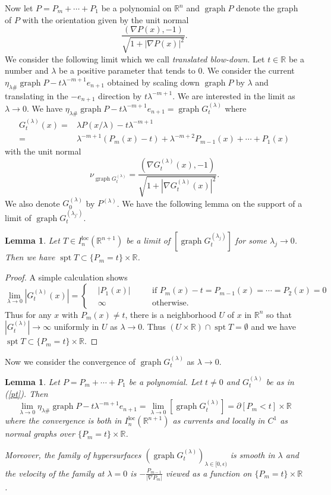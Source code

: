 \documentclass[pdflatex,sn-mathphys-num]{sn-jnl}%
\theoremstyle{thmstyleone}%
\newtheorem{lemma}[theorem]{Lemma}
\theoremstyle{thmstyletwo}%
\theoremstyle{thmstylethree}%
\newcommand{\R}{\mathbb{R}}
\newcommand{\loc}{\mathrm{loc}}
\DeclareMathOperator{\spt}{spt}
\DeclareMathOperator{\graph}{graph}
\begin{document}
Now let $P=P_m+\cdots+P_1$ be a polynomial on $\R^n$ and $\graph P$ denote the graph of $P$ with the orientation given by the unit normal \[\frac{(\nabla P(x),-1)}{\sqrt{1+|\nabla P(x)|^2}}.\] We consider the following limit which we call \textit{translated blow-down}. Let $t\in\R$ be a number and $\lambda$ be a positive parameter that tends to 0. We consider the current $\eta_{\lambda\#}\graph P-t\lambda^{-m+1}e_{n+1}$ obtained by scaling down $\graph P$ by $\lambda$ and translating in the $-e_{n+1}$ direction by $t\lambda^{-m+1}$. We are interested in the limit as $\lambda\to0$. We have $\eta_{\lambda\#}\graph P-t\lambda^{-m+1}e_{n+1}=\graph G_t^{(\lambda)}$  where	
\begin{equation}\label{pt}
	\begin{aligned}
		G_t^{(\lambda)}(x)=&\lambda P(x/\lambda)-t\lambda^{-m+1}\\=&\lambda^{-m+1}(P_m(x)-t)+\lambda^{-m+2}P_{m-1}(x)+\cdots+P_1(x)
	\end{aligned}
\end{equation}
with the unit normal 
\begin{equation}\label{normal}
	\nu_{\graph G_t^{(\lambda)}}=\frac{(\nabla G_t^{(\lambda)}(x),-1)}{\sqrt{1+|\nabla G_t^{(\lambda)}(x)|^2}}.
\end{equation}
We also denote $G_0^{(\lambda)}$ by $P^{(\lambda)}$.  We have the following lemma on the support of a limit of $\graph G_t^{(\lambda_{j'})}$. 
\begin{lemma}\label{spt}
	Let $T\in I_{n}^\loc(\R^{n+1})$  be a limit of $[\graph G_t^{(\lambda_j)}]$ for some $\lambda_j\to0$. Then we have $\spt T\subset \{P_m=t\}\times \R$.
\end{lemma}
\begin{proof}
	A simple calculation shows
	\[
	\lim_{\lambda\to 0}|G_t^{(\lambda)}(x)|=\left\{
	\begin{aligned}
		&|P_1(x)| &\quad &\text{if }P_m(x)-t=P_{m-1}(x)=\cdots=P_2(x)=0\\
		&\infty &\quad &\text{otherwise}.
	\end{aligned}\right.\]
	Thus for any $x$ with $P_m(x)\neq t$, there is a neighborhood $U$ of $x$ in $\R^n$ so that $|G_t^{(\lambda)}|\to\infty$ uniformly in $U$ as $\lambda\to 0$. Thus  $(U\times \R)\cap \spt T=\emptyset$ and we have $\spt T\subset \{P_m=t\}\times\R$.
\end{proof}
Now we consider the convergence of $\graph G_t^{(\lambda)}$ as $\lambda\to0$.
\begin{lemma}\label{convgr}
Let $P=P_m+\cdots+P_1$ be a polynomial. Let $t\neq 0$ and $G_t^{(\lambda)}$ be as in (\ref{pt}). Then \[\lim_{\lambda\to0}\eta_{\lambda\#}\graph P-t\lambda^{-m+1}e_{n+1}=\lim_{\lambda\to0}\left[\graph G_t^{(\lambda)}\right] = \partial[P_m<t]\times \R\] where the convergence is both in $I_{n}^\loc(\R^{n+1})$ as currents and locally in $C^1$ as normal graphs over $\{P_m=t\}\times\R$.

Moreover, the family of hypersurfaces $(\graph G_t^{(\lambda)})_{\lambda\in [0,\epsilon)}$ is smooth in $\lambda$ and the velocity of the family at $\lambda=0$ is $-\frac{P_{m-1}}{|\nabla P_m|}$ viewed as a function on $\{P_m=t\}\times\R$.
\end{lemma}
\end{document}

